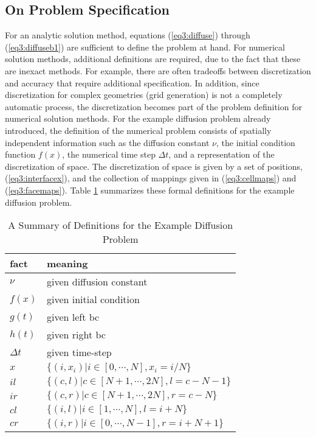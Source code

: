 \subsection{On Problem Specification}

For an analytic solution method, equations (\ref{eq3:diffuse}) through
(\ref{eq3:diffuseb1}) are sufficient to define the problem at hand.
For numerical solution methods, additional definitions are required,
due to the fact that these are inexact methods.  For example, there
are often tradeoffs between discretization and accuracy that require
additional specification.  In addition, since discretization for
complex geometries (grid generation) is not a completely automatic
process, the discretization becomes part of the problem definition for
numerical solution methods.  For the example diffusion problem already
introduced, the definition of the numerical problem consists of
spatially independent information such as the diffusion constant
$\nu$, the initial condition function $f(x)$, the numerical time step
$\Delta t$, and a representation of the discretization of space.  The
discretization of space is given by a set of positions,
(\ref{eq3:interfacex}), and the collection of mappings given in
(\ref{eq3:cellmaps}) and (\ref{eq3:facemaps}).  Table
\ref{table3:facts} summarizes these formal definitions for the example
diffusion problem.


\begin{table}[htbp]
\caption{ A Summary of Definitions for the Example Diffusion
  Problem}
\label{table3:facts}
\begin{center}
  \begin{tabular}{|l|l|}
    \hline
    fact      & meaning \\
    \hline
    $\nu$     & given diffusion constant  \\
    $f(x)$     & given initial condition  \\
    $g(t)$     & given left bc \\
    $h(t)$     & given right bc  \\
    $\Delta t$& given time-step  \\
    $x$       & $\lbrace (i,x_i) | i \in [0, \cdots, N], x_i = i/N    \rbrace$\\
    $il$      & $\lbrace (c,l)   | c \in [N+1, \cdots, 2N], l = c-N-1 \rbrace$\\
    $ir$      & $\lbrace (c,r)   | c \in [N+1, \cdots, 2N], r = c-N   \rbrace$\\
    $cl$      & $\lbrace (i,l)   | i \in [1, \cdots, N], l = i+N      \rbrace$\\
    $cr$      & $\lbrace (i,r)   | i \in [0, \cdots, N-1], r = i+N+1  \rbrace$\\
    \hline
  \end{tabular}
\end{center}
\end{table}

